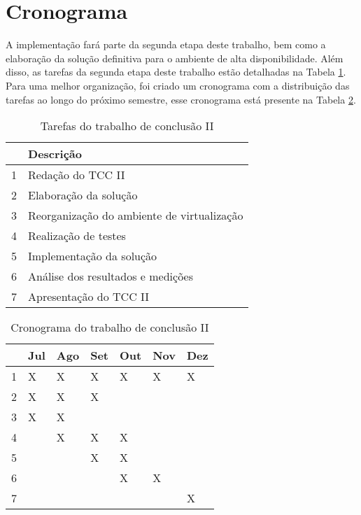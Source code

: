 \newpage
\section{Cronograma}
\label{section:cronograma}

A implementação fará parte da segunda etapa deste trabalho, bem como a elaboração da solução definitiva para o ambiente de alta disponibilidade. 
Além disso, as tarefas da segunda etapa deste trabalho estão detalhadas na Tabela \ref{tab:impltarefas}. Para uma melhor organização, foi criado
um cronograma com a distribuição das tarefas ao longo do próximo semestre, esse cronograma está presente na Tabela \ref{tab:implcronograma}.

\begin{table}[h!]\normalsize
\caption {Tarefas do trabalho de conclusão II}
\label{tab:impltarefas}
\begin{center}
\begin{tabular}{|l|l|}\hline
 & Descrição \\\hline
1 & Redação do TCC II \\\hline
2 & Elaboração da solução \\\hline
3 & Reorganização do ambiente de virtualização \\\hline
4 & Realização de testes \\\hline
5 & Implementação da solução \\\hline
6 & Análise dos resultados e medições \\\hline
7 & Apresentação do TCC II \\\hline
\end{tabular}
\end{center}
\end{table}

\begin{table}[h!]\normalsize
\caption {Cronograma do trabalho de conclusão II}
\label{tab:implcronograma}
\begin{center}
\begin{tabular}{|l|l|l|l|l|l|l|}\hline
 & Jul & Ago & Set & Out & Nov & Dez \\\hline
1 & X & X & X & X & X & X \\\hline
2 & X & X & X & & & \\\hline
3 & X & X & & & & \\\hline
4 & & X & X & X & & \\\hline
5 & & & X & X & & \\\hline
6 & & & & X & X & \\\hline
7 & & & & & & X \\\hline
\end{tabular}
\end{center}
\end{table}
